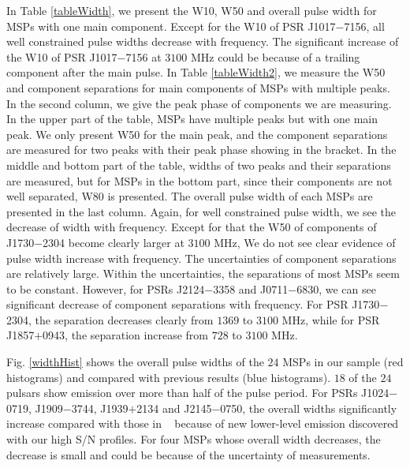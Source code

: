 \documentclass[useAMS,usenatbib]{mn2e}
\begin{document}
In Table \ref{tableWidth}, we present the W10, W50 and overall pulse width
for MSPs with one main component. 
%
Except for the W10 of PSR J1017$-$7156, all well constrained 
pulse widths decrease with frequency. The significant increase of the W10 
of PSR J1017$-$7156 at $3100$ MHz could be because of a trailing component 
after the main pulse. 
%
In Table \ref{tableWidth2}, we measure the W50 and component separations 
for main components of MSPs with multiple peaks. 
%
In the second column, we give the peak phase of components we are measuring. 
%
In the upper part of the table, MSPs have multiple peaks but with one main 
peak. We only present W50 for the main peak, and the component separations 
are measured for two peaks with their peak phase showing in the bracket.
%
In the middle and bottom part of the table, widths of two peaks and their 
separations are measured, but for MSPs in the bottom part, since their 
components are not well separated, W80 is presented. 
%
The overall pulse width of each MSPs are presented in the last column.
%
Again, for well constrained pulse width, we see the decrease of width 
with frequency. Except for that the W50 of components of J1730$-$2304 
become clearly larger at $3100$ MHz, We do not see clear evidence of pulse 
width increase with frequency.
%
The uncertainties of component separations are relatively large. Within 
the uncertainties, the separations of most MSPs seem to be constant. 
However, for PSRs J2124$-$3358 and J0711$-$6830, we can see significant 
decrease of component separations with frequency. For PSR J1730$-$2304, 
the separation decreases clearly from $1369$ to $3100$ MHz, while for 
PSR J1857$+$0943, the separation increase from $728$ to $3100$ MHz.
%

Fig. \ref{widthHist} shows the overall pulse widths of the $24$ MSPs in
our sample (red histograms) and compared with previous results (blue 
histograms). 
%
$18$ of the $24$ pulsars show emission over more than half of the pulse 
period.
%
For PSRs J1024$-$0719, J1909$-$3744, J1939$+$2134 and J2145$-$0750, 
the overall widths significantly increase compared with those in ~\citet{Yan11}
because of new lower-level emission discovered with our high S/N 
profiles.
%
For four MSPs whose overall width decreases, the decrease is 
small and could be because of the uncertainty of measurements.
%
\end{document}
